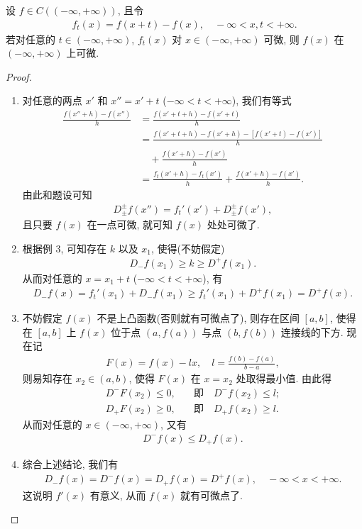\documentclass[../../main.tex]{subfiles}%
\begin{document}
\begin{example}
设 $f\in C((-\infty,+\infty))$, 且令
\begin{align*}
f_t(x) = f(x+t)-f(x), \quad -\infty < x, t < +\infty.
\end{align*}
若对任意的 $t\in(-\infty,+\infty)$, $f_t(x)$ 对 $x\in(-\infty,+\infty)$ 可微, 则 $f(x)$ 在 $(-\infty,+\infty)$ 上可微.
\end{example}
\begin{proof}
\begin{enumerate}[(1)]
\item 对任意的两点 $x'$ 和 $x''=x'+t$ ($-\infty<t<+\infty$), 我们有等式
\begin{align*}
\frac{f(x''+h)-f(x'')}{h} &= \frac{f(x'+t+h)-f(x'+t)}{h} \\
&= \frac{f(x'+t+h)-f(x'+h)-[f(x'+t)-f(x')]}{h} \\
&\quad + \frac{f(x'+h)-f(x')}{h} \\
&= \frac{f_t(x'+h)-f_t(x')}{h} + \frac{f(x'+h)-f(x')}{h}.
\end{align*}
由此和题设可知
\begin{align*}
D^\pm_\pm f(x'') = f_t'(x') + D^\pm_\pm f(x'),
\end{align*}
且只要 $f(x)$ 在一点可微, 就可知 $f(x)$ 处处可微了.

\item 根据例 3, 可知存在 $k$ 以及 $x_1$, 使得(不妨假定)
\begin{align*}
D_-f(x_1) \geqslant k \geqslant D^+f(x_1).
\end{align*}
从而对任意的 $x=x_1+t$ ($-\infty<t<+\infty$), 有
\begin{align*}
D_-f(x) = f_t'(x_1) + D_-f(x_1) \geqslant f_t'(x_1) + D^+f(x_1) = D^+f(x).
\end{align*}

\item 不妨假定 $f(x)$ 不是上凸函数(否则就有可微点了), 则存在区间 $[a,b]$, 使得在 $[a,b]$ 上 $f(x)$ 位于点 $(a,f(a))$ 与点 $(b,f(b))$ 连接线的下方. 现在记
\begin{align*}
F(x) = f(x)-lx, \quad l = \frac{f(b)-f(a)}{b-a},
\end{align*}
则易知存在 $x_2\in(a,b)$, 使得 $F(x)$ 在 $x=x_2$ 处取得最小值. 由此得
\begin{align*}
D^-F(x_2) \leqslant 0, \quad &\text{即} \quad D^-f(x_2) \leqslant l; \\
D_+F(x_2) \geqslant 0, \quad &\text{即} \quad D_+f(x_2) \geqslant l.
\end{align*}
从而对任意的 $x\in(-\infty,+\infty)$, 又有
\begin{align*}
D^-f(x) \leqslant D_+f(x).
\end{align*}

\item 综合上述结论, 我们有
\begin{align*}
D_-f(x) = D^-f(x) = D_+f(x) = D^+f(x), \quad -\infty < x < +\infty.
\end{align*}
这说明 $f'(x)$ 有意义, 从而 $f(x)$ 就有可微点了.

\end{enumerate}
\end{proof}
\end{document}
